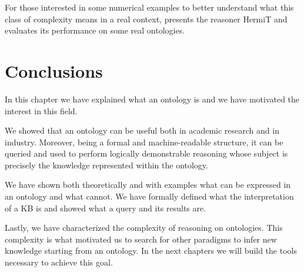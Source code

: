 For those interested in some numerical examples to better understand what this class of complexity means in a real context, \cite{glimm2014hermit} presents the reasoner HermiT and evaluates its performance on some real ontologies.

\section{Conclusions}
In this chapter we have explained what an ontology is and we have motivated the interest in this field. 

We showed that an ontology can be useful both in academic research and in industry. Moreover, being a formal and machine-readable structure, it can be queried and used to perform logically demonstrable reasoning whose subject is precisely the knowledge represented within the ontology.

We have shown both theoretically and with examples what can be expressed in an ontology and what cannot. We have formally defined what the interpretation of a KB is and showed what a query and its results are.

Lastly, we have characterized the complexity of reasoning on ontologies. This complexity is what motivated us to search for other paradigms to infer new knowledge starting from an ontology. In the next chapters we will build the tools necessary to achieve this goal.

